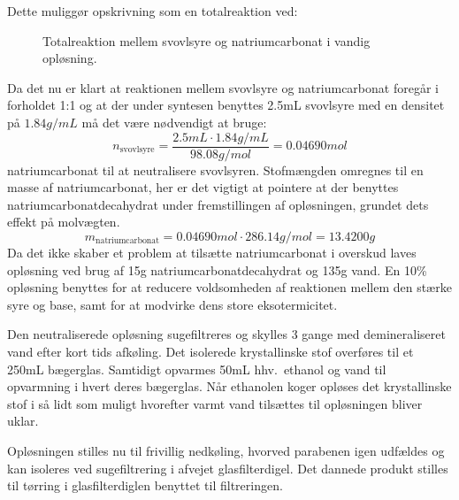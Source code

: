     Dette muliggør opskrivning som en totalreaktion ved:
    \begin{figure}[H]
        \caption{Totalreaktion mellem svovlsyre og natriumcarbonat i vandig opløsning.}
    \end{figure}
    Da det nu er klart at reaktionen mellem svovlsyre og natriumcarbonat foregår i forholdet 1:1 og at der under syntesen benyttes 2.5mL svovlsyre med en densitet på $1.84\si{g \per mL}$ må det være nødvendigt at bruge:
    \[
        n_{\text{svovlsyre}}=\frac{2.5\si{mL} \cdot 1.84\si{g\per mL}}{98.08\si{g\per mol}}=0.04690mol
    \]
    natriumcarbonat til at neutralisere svovlsyren. Stofmængden omregnes til en masse af natriumcarbonat, her er det vigtigt at pointere at der benyttes natriumcarbonatdecahydrat under fremstillingen af opløsningen, grundet dets effekt på molvægten.
    \[
        m_{\text{natriumcarbonat}}=0.04690\si{mol} \cdot 286.14\si{g\per mol}=13.4200\si{g}
    \]
    Da det ikke skaber et problem at tilsætte natriumcarbonat i overskud laves opløsning ved brug af 15g natriumcarbonatdecahydrat og 135g vand. En 10\% opløsning benyttes for at reducere voldsomheden af reaktionen mellem den stærke syre og base, samt for at modvirke dens store eksotermicitet.

    Den neutraliserede opløsning sugefiltreres og skylles 3 gange med demineraliseret vand efter kort tids afkøling. Det isolerede krystallinske stof overføres til et 250mL bægerglas. Samtidigt opvarmes 50mL hhv.\ ethanol og vand til opvarmning i hvert deres bægerglas. Når ethanolen koger opløses det krystallinske stof i så lidt som muligt hvorefter varmt vand tilsættes til opløsningen bliver uklar.

    Opløsningen stilles nu til frivillig nedkøling, hvorved parabenen igen udfældes og kan isoleres ved sugefiltrering i afvejet glasfilterdigel. Det dannede produkt stilles til tørring i glasfilterdiglen benyttet til filtreringen.

